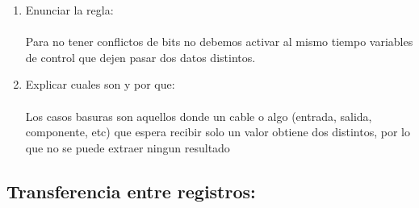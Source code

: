 \documentclass{article}
\begin{document}
\begin{enumerate}
\begin{center}
    \end{center}
    \item Enunciar la regla:\\\\
    Para no tener conflictos de bits no debemos activar al mismo tiempo variables de control que dejen pasar dos datos distintos.\\
    \item Explicar cuales son y por que:\\\\
    Los casos basuras son aquellos donde un cable o algo (entrada, salida, componente, etc) que espera recibir solo un valor obtiene dos distintos, por lo que no se puede extraer ningun resultado
\end{enumerate}
\subsection{\textbf{Transferencia entre registros:}}
\end{document}

